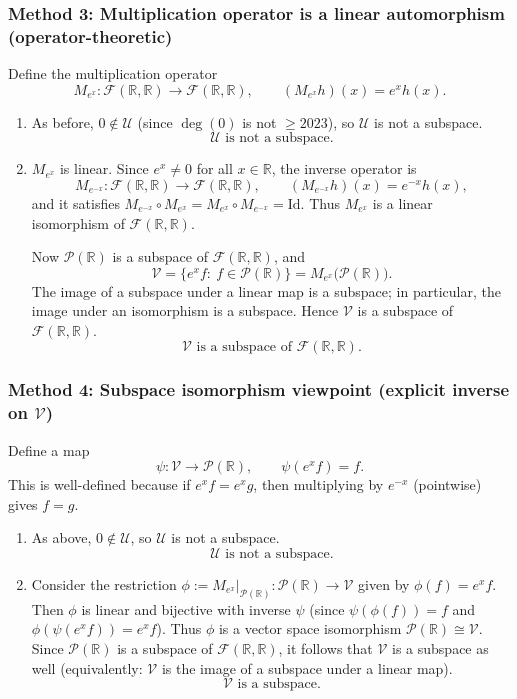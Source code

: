 \documentclass[12pt]{article}
\begin{document}
\subsubsection{Method 3: Multiplication operator is a linear automorphism (operator-theoretic)}
Define the multiplication operator
\[
M_{e^x}:\mathcal{F}(\mathbb{R},\mathbb{R})\to\mathcal{F}(\mathbb{R},\mathbb{R}),\qquad (M_{e^x}h)(x)=e^x h(x).
\]

\begin{enumerate}[label=(\alph*)]
\item As before, $0\notin\mathcal{U}$ (since $\deg(0)$ is not $\ge 2023$), so $\mathcal{U}$ is not a subspace.
\[
\boxed{\,\mathcal{U}\text{ is not a subspace.}\,}
\]

\item $M_{e^x}$ is linear. Since $e^x\neq 0$ for all $x\in\mathbb{R}$, the inverse operator is
\[
M_{e^{-x}}:\mathcal{F}(\mathbb{R},\mathbb{R})\to\mathcal{F}(\mathbb{R},\mathbb{R}),\qquad (M_{e^{-x}}h)(x)=e^{-x}h(x),
\]
and it satisfies $M_{e^{-x}}\circ M_{e^x}=M_{e^x}\circ M_{e^{-x}}=\mathrm{Id}$. Thus $M_{e^x}$ is a linear isomorphism of $\mathcal{F}(\mathbb{R},\mathbb{R})$.

Now $\mathcal{P}(\mathbb{R})$ is a subspace of $\mathcal{F}(\mathbb{R},\mathbb{R})$, and
\[
\mathcal{V}=\{e^x f:\ f\in\mathcal{P}(\mathbb{R})\}=M_{e^x}\big(\mathcal{P}(\mathbb{R})\big).
\]
The image of a subspace under a linear map is a subspace; in particular, the image under an isomorphism is a subspace. Hence $\mathcal{V}$ is a subspace of $\mathcal{F}(\mathbb{R},\mathbb{R})$.
\[
\boxed{\,\mathcal{V}\text{ is a subspace of }\mathcal{F}(\mathbb{R},\mathbb{R}).\,}
\]
\end{enumerate}

\subsubsection{Method 4: Subspace isomorphism viewpoint (explicit inverse on $\mathcal{V}$)}
Define a map
\[
\psi:\mathcal{V}\to \mathcal{P}(\mathbb{R}),\qquad \psi(e^x f)=f.
\]
This is well-defined because if $e^x f=e^x g$, then multiplying by $e^{-x}$ (pointwise) gives $f=g$.

\begin{enumerate}[label=(\alph*)]
\item As above, $0\notin\mathcal{U}$, so $\mathcal{U}$ is not a subspace.
\[
\boxed{\,\mathcal{U}\text{ is not a subspace.}\,}
\]

\item Consider the restriction $\phi:=M_{e^x}\big|_{\mathcal{P}(\mathbb{R})}:\mathcal{P}(\mathbb{R})\to\mathcal{V}$ given by $\phi(f)=e^x f$.
Then $\phi$ is linear and bijective with inverse $\psi$ (since $\psi(\phi(f))=f$ and $\phi(\psi(e^x f))=e^x f$).
Thus $\phi$ is a vector space isomorphism $\mathcal{P}(\mathbb{R})\cong \mathcal{V}$.
Since $\mathcal{P}(\mathbb{R})$ is a subspace of $\mathcal{F}(\mathbb{R},\mathbb{R})$, it follows that $\mathcal{V}$ is a subspace as well (equivalently: $\mathcal{V}$ is the image of a subspace under a linear map).
\[
\boxed{\,\mathcal{V}\text{ is a subspace.}\,}
\]
\end{enumerate}
\newpage
\end{document}
